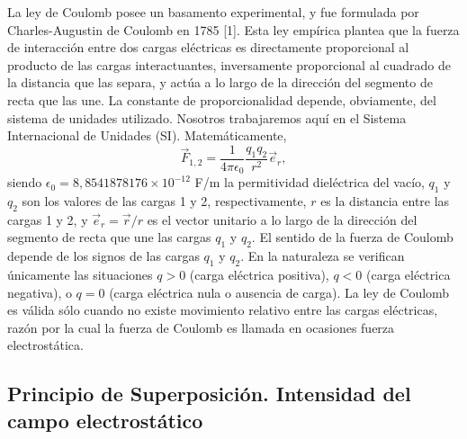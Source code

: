 \documentclass[12pt,a4paper]{book}
\begin{document}
La ley de Coulomb posee un basamento experimental, y fue formulada por Charles-Augustin de Coulomb en 1785 [1]. Esta ley empírica plantea que la fuerza de interacción entre dos cargas eléctricas es directamente proporcional al producto de las cargas interactuantes, inversamente proporcional al cuadrado de la distancia que las separa, y actúa a lo largo de la dirección del segmento de recta que las une. La constante de proporcionalidad depende, obviamente, del sistema de unidades utilizado. Nosotros trabajaremos aquí en el Sistema Internacional de Unidades (SI).
Matemáticamente,
\begin{equation}
\vec{F}_{1,2} = \frac{1}{4\pi\epsilon_0}\frac{q_1 q_2}{r^2}\vec{e}_r,
\end{equation}
siendo $\epsilon_0 = 8, 8541878176\times10^{-12}$ F/m la permitividad dieléctrica del vacío, $q_1$ y $q_2$ son los valores de las cargas 1 y 2, respectivamente, $r$ es la distancia entre las cargas 1 y 2, y $\vec{e}_r = \vec{r}/r$ es el vector unitario a lo largo de la dirección del segmento de recta que une las cargas $q_1$ y $q_2$. El sentido de la fuerza de Coulomb depende de los signos de las cargas $q_1$ y $q_2$. En la naturaleza se verifican únicamente las situaciones $q > 0$ (carga eléctrica positiva), $q < 0$ (carga eléctrica negativa), o $q = 0$ (carga eléctrica nula o ausencia de carga). La ley de Coulomb es válida sólo cuando no existe movimiento relativo entre las cargas eléctricas, razón por la cual la fuerza de Coulomb es llamada en ocasiones fuerza electrostática.

\subsection{Principio de Superposición. Intensidad del campo electrostático}
\end{document}
